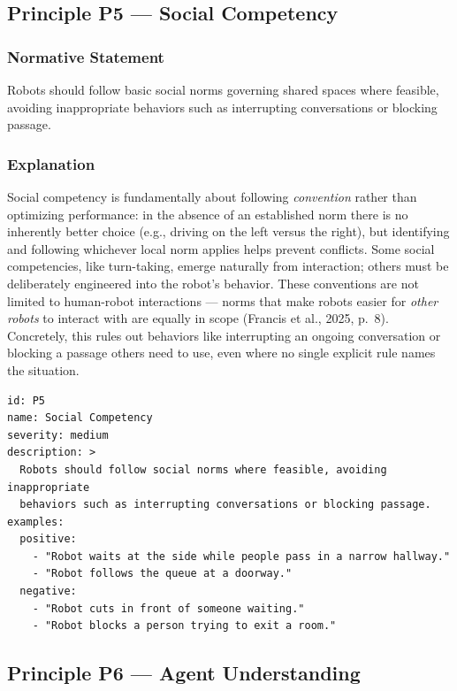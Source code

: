 \documentclass[utf8]{frontiers_suppmat} %
\begin{document}
\subsection{Principle P5 --- Social
Competency}\label{principle-p5-social-competency}

\subsubsection{Normative Statement}\label{normative-statement-5}

Robots should follow basic social norms governing shared spaces where
feasible, avoiding inappropriate behaviors such as interrupting
conversations or blocking passage.

\subsubsection{Explanation}\label{explanation-5}

Social competency is fundamentally about following \emph{convention}
rather than optimizing performance: in the absence of an established
norm there is no inherently better choice (e.g., driving on the left
versus the right), but identifying and following whichever local norm
applies helps prevent conflicts. Some social competencies, like
turn-taking, emerge naturally from interaction; others must be
deliberately engineered into the robot's behavior. These conventions are
not limited to human-robot interactions --- norms that make robots
easier for \emph{other robots} to interact with are equally in scope
(Francis et al., 2025, p.~8). Concretely, this rules out behaviors like
interrupting an ongoing conversation or blocking a passage others need
to use, even where no single explicit rule names the situation.

\begin{lstlisting}[style=literatecard]
id: P5
name: Social Competency
severity: medium
description: >
  Robots should follow social norms where feasible, avoiding inappropriate
  behaviors such as interrupting conversations or blocking passage.
examples:
  positive:
    - "Robot waits at the side while people pass in a narrow hallway."
    - "Robot follows the queue at a doorway."
  negative:
    - "Robot cuts in front of someone waiting."
    - "Robot blocks a person trying to exit a room."
\end{lstlisting}

\subsection{Principle P6 --- Agent
Understanding}\label{principle-p6-agent-understanding}
\end{document}
